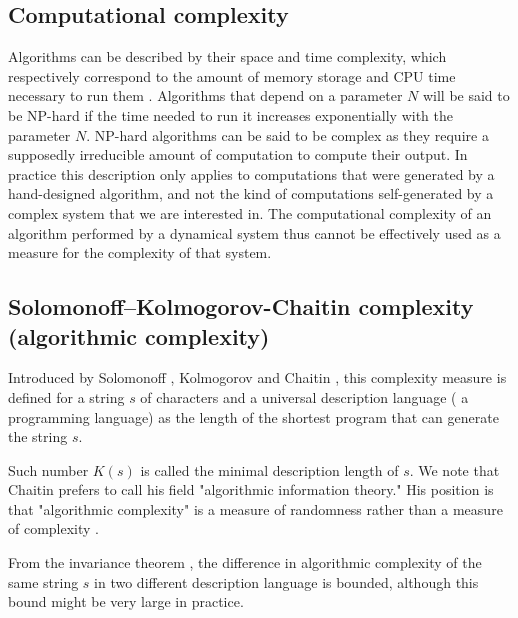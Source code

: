 \subsection{Computational complexity}
Algorithms can be described by their space and time complexity, which
respectively correspond to the amount of memory storage and CPU time necessary
to run them \parencite{traubInformationUncertaintyComplexity1983,
  packelRecentDevelopmentsInformationbased1987,
  hopcroftIntroductionAutomataTheory2007}. Algorithms that depend on a parameter
$N$ will be said to be NP-hard if the time needed to run it increases
exponentially with the parameter $N$. NP-hard algorithms can be said to be
complex as they require a supposedly irreducible amount of computation to
compute their output. In practice this description only applies to computations
that were generated by a hand-designed algorithm, and not the kind of
computations self-generated by a complex system that we are interested in. The
computational complexity of an algorithm performed by a dynamical system thus
cannot be effectively used as a measure for the complexity of that system.

\subsection{Solomonoff–Kolmogorov-Chaitin complexity (algorithmic
  complexity)}

Introduced by Solomonoff \parencite{solomonoffPreliminaryReportGeneral1960},
Kolmogorov \parencite{kolmogorovThreeApproachesQuantitative1968} and Chaitin
\parencite{chaitinLengthProgramsComputing1969,
  chaitinAlgorithmicInformationTheory1977,
  chaitinInformationRandomnessIncompleteness1990}, this complexity measure is
defined for a string $s$ of characters and a universal description language (\eg
a programming language) as the length of the shortest program that can generate
the string $s$.

Such number $K(s)$ is called the minimal description length of
$s$. We note that Chaitin prefers to call his field "algorithmic information
theory." His position is that "algorithmic complexity" is a measure of
randomness rather than a measure of complexity
\parencite{chaitinInformationRandomnessIncompleteness1990}.

From the invariance theorem \parencite{solomonoffFormalTheoryInductive1964,
  solomonoffFormalTheoryInductive1964a,
  kolmogorovThreeApproachesQuantitative1968,
  chaitinLengthProgramsComputing1969}, the difference in algorithmic complexity
of the same string $s$ in two different description language is bounded,
although this bound might be very large in practice.


